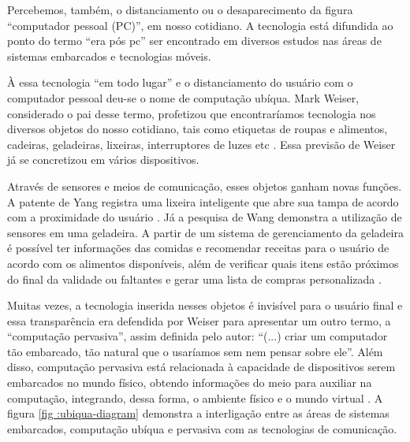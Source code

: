 Percebemos, também, o distanciamento ou o desaparecimento da figura ``computador
pessoal (PC)'', em nosso cotidiano. A tecnologia está difundida ao ponto do
termo  ``era pós pc'' ser encontrado em diversos estudos
\cite{bonilla2011inclusao,  chen2011pospc, press1999personal} nas áreas de
sistemas embarcados e  tecnologias móveis.

À essa tecnologia ``em todo lugar'' e o distanciamento do usuário com o 
computador pessoal deu-se o nome de computação ubíqua. Mark Weiser, considerado 
o pai desse termo, profetizou que encontraríamos tecnologia nos diversos objetos
do nosso cotidiano, tais como etiquetas de roupas e alimentos, cadeiras, 
geladeiras, lixeiras, interruptores de luzes etc \cite{weiser1991computer}. Essa 
previsão de Weiser já se concretizou em vários dispositivos.

Através de sensores e meios de comunicação, esses objetos ganham novas funções.
A patente de Yang registra uma lixeira inteligente que abre sua tampa de acordo
com a proximidade do usuário \cite{yang2005trash}. Já a pesquisa de Wang
demonstra a utilização de sensores em uma geladeira. A partir de um sistema de
gerenciamento da geladeira é possível ter informações das comidas e recomendar
receitas para o usuário de acordo com os alimentos disponíveis, além de 
verificar quais itens estão próximos do final da validade ou faltantes e gerar 
uma lista de compras personalizada \cite{hou2013}.


Muitas vezes, a tecnologia inserida nesses objetos é invisível para o usuário
final e essa transparência era defendida por Weiser para apresentar um outro
termo, a ``computação pervasiva'', assim definida pelo autor: ``(...) criar  um
computador tão embarcado, tão natural que o usaríamos sem nem pensar sobre
ele''. Além disso, computação pervasiva está relacionada à capacidade de
dispositivos serem embarcados no mundo físico, obtendo informações do meio para
auxiliar na computação, integrando, dessa forma, o ambiente físico e o mundo
virtual \cite{bolsoni2009computaccao, de2003computaccao}. A figura  \ref{fig
:ubiqua-diagram} demonstra a interligação entre as áreas de sistemas
embarcados, computação ubíqua e pervasiva com as tecnologias de comunicação.

